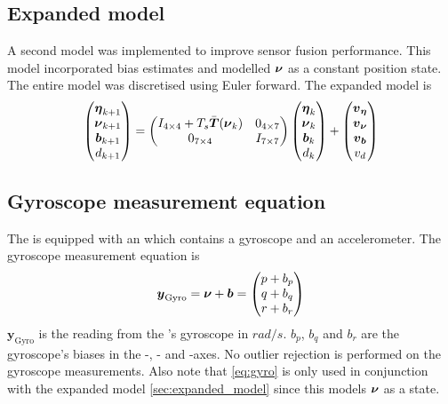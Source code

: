 \subsection{Expanded model}\label{sec:expanded_model}
A second model was implemented to improve sensor fusion performance. This model incorporated bias estimates and modelled $\boldsymbol{\nu}$ as a constant position state. The entire model was discretised using Euler forward. The expanded model is 
\begin{equation}\label{eq:expanded_model}
\begin{pmatrix}
\boldsymbol{\eta}_{k+1}\\
\boldsymbol{\nu}_{k+1}\\
\boldsymbol{b}_{k+1}\\
d_{k+1}
\end{pmatrix}=
\begin{pmatrix}
I_{4\times4} + T_s \bar{\boldsymbol{T}}(\boldsymbol{\nu}_{k})& 0_{4\times7}\\
0_{7\times4} & I_{7\times7}\\
\end{pmatrix}
\begin{pmatrix}
\boldsymbol{\eta}_{k}\\
\boldsymbol{\nu}_{k}\\
\boldsymbol{b}_{k}\\
d_{k}
\end{pmatrix}
+\begin{pmatrix}
  \boldsymbol{v}_{\boldsymbol{\eta}}\\
  \boldsymbol{v}_{\boldsymbol{\nu}}\\
  \boldsymbol{v}_{\boldsymbol{b}}\\
  v_d 
\end{pmatrix}
\end{equation}

\subsection{Gyroscope measurement equation}
The \abbrROV is equipped with an \abbrIMU which contains a gyroscope and an accelerometer. The gyroscope measurement equation is 
\begin{equation}\label{eq:gyro}
\boldsymbol{y}_\text{Gyro}= \boldsymbol{\nu} + \boldsymbol{b} =
 \begin{pmatrix}
p + b_p\\
q + b_q\\
r + b_r
\end{pmatrix}
\end{equation}
 $\boldsymbol{y}_\text{Gyro}$ is the reading from the \abbrIMU's gyroscope in $rad/s$. $b_p$, $b_q$ and $b_r$ are the gyroscope's biases in the \xPosition-, \yPosition- and \zPosition-axes. No outlier rejection is performed on the gyroscope measurements. Also note that \eqref{eq:gyro} is only used in conjunction with the expanded model \eqref{sec:expanded_model} since this models $\boldsymbol{\nu}$ as a state. 

